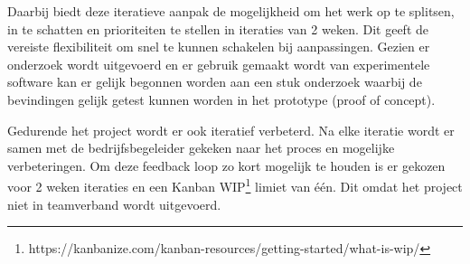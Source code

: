 Daarbij biedt deze iteratieve aanpak de mogelijkheid om het werk op te splitsen, in te schatten en prioriteiten te stellen in iteraties van 2 weken. Dit geeft de vereiste flexibiliteit om snel te kunnen schakelen bij aanpassingen. Gezien er onderzoek wordt uitgevoerd en er gebruik gemaakt wordt van experimentele software kan er gelijk begonnen worden aan een stuk onderzoek waarbij de bevindingen gelijk getest kunnen worden in het prototype (proof of concept).\par

Gedurende het project wordt er ook iteratief verbeterd. Na elke iteratie wordt er samen met de bedrijfsbegeleider gekeken naar het proces en mogelijke verbeteringen. Om deze feedback loop zo kort mogelijk te houden is er gekozen voor 2 weken iteraties en een Kanban WIP\footnote{https://kanbanize.com/kanban-resources/getting-started/what-is-wip/} limiet van één. Dit omdat het project niet in teamverband wordt uitgevoerd.